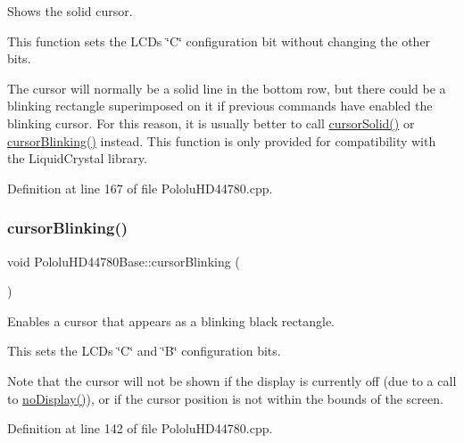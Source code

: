 Shows the solid cursor.

This function sets the L\+CD\textquotesingle{}s \char`\"{}\+C\char`\"{} configuration bit without changing the other bits.

The cursor will normally be a solid line in the bottom row, but there could be a blinking rectangle superimposed on it if previous commands have enabled the blinking cursor. For this reason, it is usually better to call \hyperlink{class_pololu_h_d44780_base_a6a4d8e79beda9f7c81659a8e13c8c338}{cursor\+Solid()} or \hyperlink{class_pololu_h_d44780_base_a6a53a6cffbb77953b5a2c4ae49e288de}{cursor\+Blinking()} instead. This function is only provided for compatibility with the Liquid\+Crystal library. 

Definition at line 167 of file Pololu\+H\+D44780.\+cpp.

\mbox{\label{class_pololu_h_d44780_base_a6a53a6cffbb77953b5a2c4ae49e288de}} 
\subsubsection{\texorpdfstring{cursor\+Blinking()}{cursorBlinking()}}
{\footnotesize\ttfamily void Pololu\+H\+D44780\+Base\+::cursor\+Blinking (\begin{DoxyParamCaption}{ }\end{DoxyParamCaption})}

Enables a cursor that appears as a blinking black rectangle.

This sets the L\+CD\textquotesingle{}s \char`\"{}\+C\char`\"{} and \char`\"{}\+B\char`\"{} configuration bits.

Note that the cursor will not be shown if the display is currently off (due to a call to \hyperlink{class_pololu_h_d44780_base_abc2d4e126017565c2a0cf2aac67870a0}{no\+Display()}), or if the cursor position is not within the bounds of the screen. 

Definition at line 142 of file Pololu\+H\+D44780.\+cpp.

\mbox{\label{class_pololu_h_d44780_base_a6a4d8e79beda9f7c81659a8e13c8c338}} 
